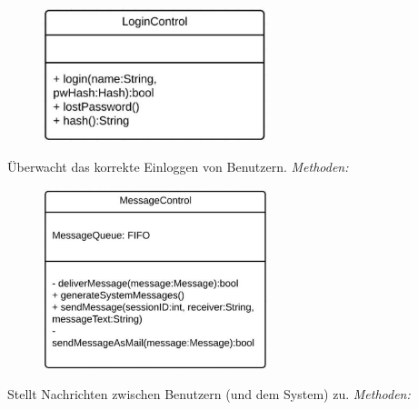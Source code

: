 \begin{itemize}
\begin{itemize}
                    \begin{figure}[htb]
                    \centering
                    \includegraphics[width=6.5cm]{Diagramms/class/singleclass/ControlLogin.pdf}
                    \end{figure}
                    \newline
                        Überwacht das korrekte Einloggen von Benutzern.
                                                           \newline
                    \emph{Methoden:}
                        \begin{itemize}
                        \end{itemize}

                    \newline
                    \begin{figure}[htb]
                    \centering
                    \includegraphics[width=6.5cm]{Diagramms/class/singleclass/ControlMessage.pdf}
                    \end{figure}
                    \newline
                        Stellt Nachrichten zwischen Benutzern (und dem System) zu.
                    \newline
                    \emph{Methoden:}
                        \begin{itemize}
                        \end{itemize}


\end{itemize}
\end{itemize}
